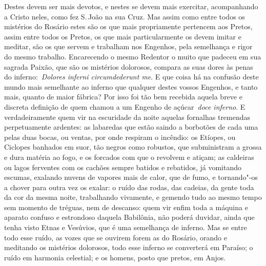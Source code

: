 Destes devem ser mais devotos, e nestes se devem mais
exercitar, acompanhando a Cristo neles, como fez S.\,João na sua Cruz.
Mas assim como entre todos os mistérios do Rosário estes são os que mais
propriamente pertencem aos Pretos, assim entre todos os Pretos, os que
mais particularmente os devem imitar e meditar, são os que servem e
trabalham nos Engenhos, pela semelhança e rigor do mesmo trabalho.
Encarecendo o mesmo Redentor o muito que padeceu em sua sagrada Paixão,
que são os mistérios dolorosos, compara as suas dores às penas do
inferno:~\emph{Dolores inferni circumdederunt me}. E
que coisa há na confusão deste mundo mais semelhante ao inferno que
qualquer destes vossos Engenhos, e tanto mais, quanto de maior fábrica?
Por isso foi tão bem recebida aquela breve e discreta definição de quem
chamou a um Engenho de açúcar~\emph{doce inferno}. E verdadeiramente
quem vir na escuridade da noite aquelas fornalhas tremendas
perpetuamente ardentes: as labaredas que estão saindo a borbotões de
cada uma pelas duas bocas, ou ventas, por onde respiram o incêndio: os
Etíopes, ou Ciclopes banhados em suor, tão negros como robustos, que
subministram a grossa e dura matéria ao fogo, e os forcados com que o
revolvem e atiçam; as caldeiras ou lagos ferventes com os cachões sempre
batidos e rebatidos, já vomitando escumas, exalando nuvens de vapores
mais de calor, que de fumo, e tornando"-os a chover para outra vez os
exalar: o ruído das rodas, das cadeias, da gente toda da cor da mesma
noite, trabalhando vivamente, e gemendo tudo ao mesmo tempo sem momento
de tréguas, nem de descanso: quem vir enfim toda a máquina e aparato
confuso e estrondoso daquela Babilônia, não poderá duvidar, ainda que
tenha visto Etnas e Vesúvios, que é uma semelhança de inferno. Mas se
entre todo esse ruído, as vozes que se ouvirem forem as do Rosário,
orando e meditando os mistérios dolorosos, todo esse inferno se
converterá em Paraíso; o ruído em harmonia celestial; e os homens, posto
que pretos, em Anjos.


